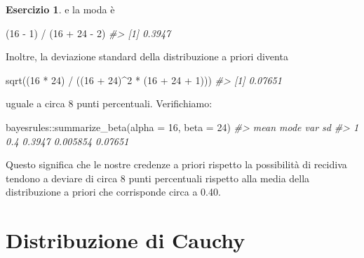 \documentclass[
  11pt,
]{krantz}
\makeatletter
\newenvironment{Shaded}{\begin{snugshade}}{\end{snugshade}}
\newcommand{\AttributeTok}[1]{\textcolor[rgb]{0.61,0.61,0.61}{#1}}
\newcommand{\CommentTok}[1]{\textcolor[rgb]{0.37,0.37,0.37}{\textit{#1}}}
\newcommand{\DecValTok}[1]{\textcolor[rgb]{0.06,0.06,0.06}{#1}}
\newcommand{\FunctionTok}[1]{\textcolor[rgb]{0,0,0}{#1}}
\newcommand{\NormalTok}[1]{#1}
\newcommand{\SpecialCharTok}[1]{\textcolor[rgb]{0,0,0}{#1}}
\newenvironment{kframe}{%
\medskip{}
\setlength{\fboxsep}{.8em}
 \def\at@end@of@kframe{}%
 \ifinner\ifhmode%
  \def\at@end@of@kframe{\end{minipage}}%
  \begin{minipage}{\columnwidth}%
 \fi\fi%
 \def\FrameCommand##1{\hskip\@totalleftmargin \hskip-\fboxsep
 \colorbox{shadecolor}{##1}\hskip-\fboxsep
     \hskip-\linewidth \hskip-\@totalleftmargin \hskip\columnwidth}%
 \MakeFramed {\advance\hsize-\width
   \@totalleftmargin\z@ \linewidth\hsize
   \@setminipage}}%
 {\par\unskip\endMakeFramed%
 \at@end@of@kframe}
\renewenvironment{Shaded}{\begin{kframe}}{\end{kframe}}
\theoremstyle{definition}
\theoremstyle{definition}
\theoremstyle{definition}
\newtheorem{exercise}{Esercizio}[chapter]
\theoremstyle{definition}
\theoremstyle{remark}
\makeatother
\begin{document}
\begin{exercise}
e la moda è

\begin{Shaded}
\begin{Highlighting}[]
\NormalTok{(}\DecValTok{16} \SpecialCharTok{{-}} \DecValTok{1}\NormalTok{) }\SpecialCharTok{/}\NormalTok{ (}\DecValTok{16} \SpecialCharTok{+} \DecValTok{24} \SpecialCharTok{{-}} \DecValTok{2}\NormalTok{)}
\CommentTok{\#\textgreater{} [1] 0.3947}
\end{Highlighting}
\end{Shaded}

Inoltre, la deviazione standard della distribuzione a priori diventa

\begin{Shaded}
\begin{Highlighting}[]
\FunctionTok{sqrt}\NormalTok{((}\DecValTok{16} \SpecialCharTok{*} \DecValTok{24}\NormalTok{) }\SpecialCharTok{/}\NormalTok{ ((}\DecValTok{16} \SpecialCharTok{+} \DecValTok{24}\NormalTok{)}\SpecialCharTok{\^{}}\DecValTok{2} \SpecialCharTok{*}\NormalTok{ (}\DecValTok{16} \SpecialCharTok{+} \DecValTok{24} \SpecialCharTok{+} \DecValTok{1}\NormalTok{)))}
\CommentTok{\#\textgreater{} [1] 0.07651}
\end{Highlighting}
\end{Shaded}

uguale a circa 8 punti percentuali. Verifichiamo:

\begin{Shaded}
\begin{Highlighting}[]
\NormalTok{bayesrules}\SpecialCharTok{::}\FunctionTok{summarize\_beta}\NormalTok{(}\AttributeTok{alpha =} \DecValTok{16}\NormalTok{, }\AttributeTok{beta =} \DecValTok{24}\NormalTok{)}
\CommentTok{\#\textgreater{}   mean   mode      var      sd}
\CommentTok{\#\textgreater{} 1  0.4 0.3947 0.005854 0.07651}
\end{Highlighting}
\end{Shaded}

Questo significa che le nostre credenze a priori rispetto la possibilità di recidiva tendono a deviare di circa 8 punti percentuali rispetto alla media della distribuzione a priori che corrisponde circa a 0.40.
\end{exercise}

\hypertarget{distribuzione-di-cauchy}{%
\section{Distribuzione di Cauchy}\label{distribuzione-di-cauchy}}
\end{document}
